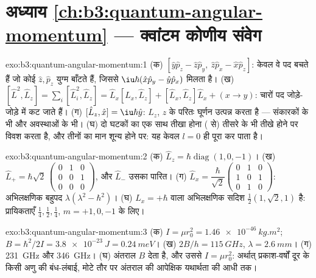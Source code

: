 \section*{अध्याय \ref{ch:b3:quantum-angular-momentum} --- क्वांटम कोणीय संवेग}

\begin{solution}{exo:b3:quantum-angular-momentum:1}
(क) $[\hat y\hat p_z - \hat z\hat p_y,\ \hat z\hat p_x - \hat x\hat
p_z]$: केवल वे पद बचते हैं जो कोई $\hat z, \hat p_z$ युग्म बाँटते हैं,
जिससे $\iu\hbar(\hat x\hat p_y - \hat y\hat p_x)$ मिलता है। (ख) $[\hat
L^2, \hat L_z] = \sum_i[\hat L_i^2, \hat L_z] = \hat L_x[\hat L_x,
\hat L_z] + [\hat L_x, \hat L_z]\hat L_x + (x \to y)$: चारों
पद जोड़े-जोड़े में कट जाते हैं। (ग) $[\hat L_z, \hat x] = \iu\hbar\hat y$:
$\hat L_z$, $z$ के परितः घूर्णन उत्पन्न करता है --- संकारकों के भी और
अवस्थाओं के भी। (घ) दो घटकों का एक साथ तीखा होना ( से)
तीसरे के भी तीखे होने पर विवश करता है, और तीनों का मान शून्य होने पर:
यह केवल $l = 0$ ही पूरा कर पाता है।
\end{solution}

\begin{solution}{exo:b3:quantum-angular-momentum:2}
(क) $\hat L_z = \hbar\operatorname{diag}(1, 0, -1)$। (ख) $\hat L_+ =
\hbar\sqrt2\,\begin{pmatrix}0&1&0\\0&0&1\\0&0&0
\end{pmatrix}$, और $\hat L_-$ उसका पारित। (ग) $\hat L_x =
\dfrac{\hbar}{\sqrt2}\begin{pmatrix}0&1&0\\1&0&1\\0&1&0
\end{pmatrix}$: अभिलक्षणिक बहुपद $\lambda(\lambda^2 -
\hbar^2)$। (घ) $L_x = +\hbar$ वाला अभिलक्षणिक सदिश $\tfrac12(1,
\sqrt2, 1)$ है: प्रायिकताएँ $\tfrac14, \tfrac12, \tfrac14$, $m =
+1, 0, -1$ के लिए।
\end{solution}

\begin{solution}{exo:b3:quantum-angular-momentum:3}
(क) $I = \mu r_0^2 = \qty{1.46e-46}{kg.m^2}$; $B = \hbar^2/2I =
\qty{3.8e-23}{J} = \qty{0.24}{meV}$। (ख) $2B/h = \qty{115}{GHz}$,
$\lambda = \qty{2.6}{mm}$। (ग) \qty{231}{GHz} और \qty{346}{GHz}।
(घ) अंतराल $B$ देता है, और उससे $I = \mu r_0^2$: अर्थात् प्रकाश-वर्षों
दूर के किसी अणु की बंध-लंबाई, मोटे तौर पर अंतराल की आपेक्षिक
यथार्थता की आधी तक।
\end{solution}

